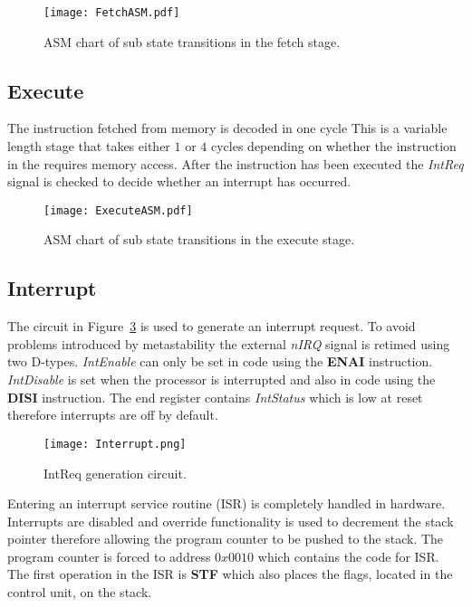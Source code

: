 \begin{figure}[ht]
   \centering
    \texttt{[image: FetchASM.pdf]}
		\caption{ASM chart of sub state transitions in the fetch stage.}
		\label{fig:FetchASM}
\end{figure}





\subsection{Execute}

The instruction fetched from memory is decoded in one cycle
This is a variable length stage that takes either $1$ or $4$ cycles depending on whether the instruction in the requires memory access.
After the instruction has been executed the \textit{IntReq} signal is checked to decide whether an interrupt has occurred.

\begin{figure}[ht]
   \centering
    \texttt{[image: ExecuteASM.pdf]}
		\caption{ASM chart of sub state transitions in the execute stage.}
		\label{fig:ExecuteASM}
\end{figure}





\subsection{Interrupt}

The circuit in Figure~\ref{fig:IntReqCircuit} is used to generate an interrupt request.
To avoid problems introduced by metastability the external \textit{nIRQ} signal is retimed using two D-types.
\textit{IntEnable} can only be set in code using the \textbf{ENAI} instruction.
\textit{IntDisable} is set when the processor is interrupted and also in code using the \textbf{DISI} instruction.
The end register contains \textit{IntStatus} which is low at reset therefore interrupts are off by default. 

\begin{figure}[ht]
   \centering
    \texttt{[image: Interrupt.png]}
		\caption{IntReq generation circuit.}
		\label{fig:IntReqCircuit}
\end{figure}


Entering an interrupt service routine (ISR) is completely handled in hardware. 
Interrupts are disabled and override functionality is used to decrement the stack pointer therefore allowing the program counter to be pushed to the stack.
The program counter is forced to address $0x0010$ which contains the code for ISR. 
The first operation in the ISR is \textbf{STF} which also places the flags, located in the control unit, on the stack.

